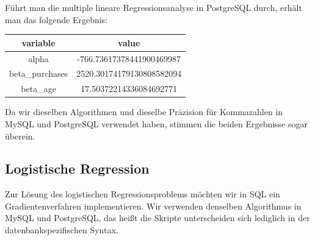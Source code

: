 Führt man die multiple lineare Regressionsanalyse in PostgreSQL durch, erhält man das folgende Ergebnis:

\begin{center}
  \begin{tabular}{|c|c|}\hline
    \textbf{variable} & \textbf{value} \\ \hline
    alpha & -766.73617378441900469987 \\ \hline
    beta\_purchases & 2520.30174179130808582094 \\ \hline
    beta\_age & 17.50372214336084692771 \\ \hline
  \end{tabular}
\end{center}

Da wir dieselben Algorithmen und dieselbe Präzision für Kommazahlen in MySQL und PostgreSQL verwendet haben, stimmen die beiden Ergebnisse sogar überein.

\subsection{Logistische Regression}
\label{subsection:3:4:3}

Zur Lösung des logistischen Regressionsproblems möchten wir in SQL ein Gradientenverfahren implementieren. Wir verwenden denselben Algorithmus in MySQL und PostgreSQL, das heißt die Skripte unterscheiden sich lediglich in der datenbankspezifischen Syntax.

